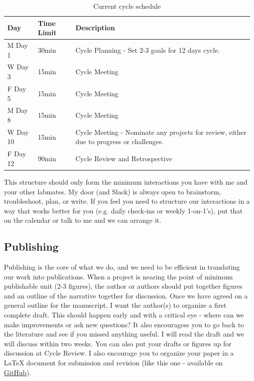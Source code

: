 \documentclass[10pt, a4paper, twocolumn]{article} %
\begin{document}
\begin{table}
	\caption{Current cycle schedule}
	\centering
	\begin{tabular}{lll}
		\toprule
		\cmidrule(r){1-2}
		Day & Time Limit & Description \\
		\midrule
		M Day 1 & 30min & Cycle Planning - Set 2-3 goals for 12 days cycle. \\
		W Day 3 & 15min & Cycle Meeting  \\
		F Day 5 & 15min & Cycle Meeting \\
		M Day 8 & 15min & Cycle Meeting \\
		W Day 10 & 15min & Cycle Meeting - Nominate any projects for review, either due to progress or challenges.  \\
		F Day 12 & 90min & Cycle Review and Retrospective \\
		\bottomrule
	\end{tabular}
\end{table}

This structure should only form the minimum interactions you have with me and your other labmates. My door (and Slack) is always open to brainstorm, troubleshoot, plan, or write. If you feel you need to structure our interactions in a way that works better for you (e.g. daily check-ins or weekly 1-on-1's), put that on the calendar or talk to me and we can arrange it.
\subsection{Publishing}
Publishing is the core of what we do, and we need to be efficient in translating our work into publications. When a project is nearing the point of minimum publishable unit (2-3 figures), the author or authors should put together figures and an outline of the narrative together for discussion. Once we have agreed on a general outline for the manuscript, I want the author(s) to organize a first complete draft. This should happen early and with a critical eye - where can we make improvements or ask new questions? It also encouragess you to go back to the literature and see if you missed anything useful. I will read the draft and we will discuss within two weeks. You can also put your drafts or figures up for discussion at Cycle Review. I also encourage you to organize your paper in a LaTeX document for submission and revision (like this one - available on \href{https://github.com/QVEU/QVEU/blob/main/ExpectationsDocument/ExpectationsDoc/main.tex}{GitHub}).
\end{document}
